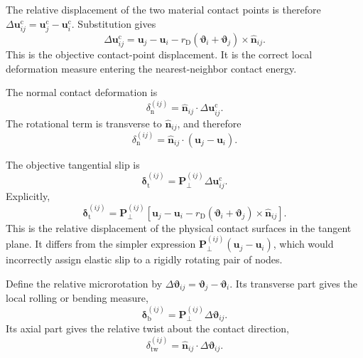 The relative displacement of the two material contact points is therefore $\Delta\mathbf{u}_{ij}^{\mathrm{c}} = \mathbf{u}_j^{\mathrm{c}} - \mathbf{u}_i^{\mathrm{c}}$. Substitution gives
\begin{equation}
    \boxed{ \Delta\mathbf{u}_{ij}^{\mathrm{c}} = \mathbf{u}_j - \mathbf{u}_i - r_{\mathrm{D}} (\boldsymbol{\vartheta}_i+\boldsymbol{\vartheta}_j) \times \hat{\mathbf{n}}_{ij} }.
\end{equation}
This is the objective contact-point displacement. It is the correct local deformation measure entering the nearest-neighbor contact energy.

The normal contact deformation is
\begin{equation}
    \delta_{\mathrm{n}}^{(ij)} = \hat{\mathbf{n}}_{ij} \cdot \Delta\mathbf{u}_{ij}^{\mathrm{c}}.
\end{equation}
The rotational term is transverse to $\hat{\mathbf{n}}_{ij}$, and therefore
\begin{equation}
    \boxed{ \delta_{\mathrm{n}}^{(ij)} = \hat{\mathbf{n}}_{ij} \cdot (\mathbf{u}_j-\mathbf{u}_i) }.
\end{equation}

The objective tangential slip is
\begin{equation}
    \boldsymbol{\delta}_{\mathrm{t}}^{(ij)} = \mathbf{P}_{\perp}^{(ij)} \Delta\mathbf{u}_{ij}^{\mathrm{c}}.
\end{equation}
Explicitly,
\begin{equation}
    \boxed{ \boldsymbol{\delta}_{\mathrm{t}}^{(ij)} = \mathbf{P}_{\perp}^{(ij)} \left[ \mathbf{u}_j-\mathbf{u}_i - r_{\mathrm{D}} (\boldsymbol{\vartheta}_i+\boldsymbol{\vartheta}_j) \times \hat{\mathbf{n}}_{ij} \right] }.
\end{equation}
This is the relative displacement of the physical contact surfaces in the tangent plane. It differs from the simpler expression $\mathbf{P}_{\perp}^{(ij)}(\mathbf{u}_j-\mathbf{u}_i)$, which would incorrectly assign elastic slip to a rigidly rotating pair of nodes.

Define the relative microrotation by $\Delta\boldsymbol{\vartheta}_{ij} = \boldsymbol{\vartheta}_j-\boldsymbol{\vartheta}_i$. Its transverse part gives the local rolling or bending measure,
\begin{equation}
    \boxed{ \boldsymbol{\delta}_{\mathrm{b}}^{(ij)} = \mathbf{P}_{\perp}^{(ij)} \Delta\boldsymbol{\vartheta}_{ij} }.
\end{equation}
Its axial part gives the relative twist about the contact direction,
\begin{equation}
    \boxed{ \delta_{\mathrm{tw}}^{(ij)} = \hat{\mathbf{n}}_{ij} \cdot \Delta\boldsymbol{\vartheta}_{ij} }.
\end{equation}

